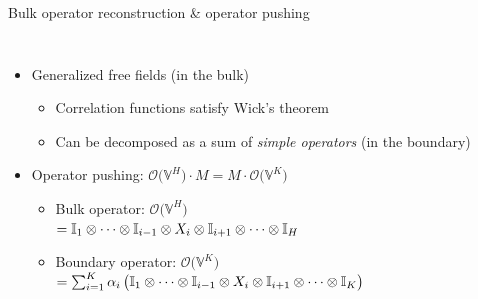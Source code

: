 \documentclass{fdubeamer}
\begin{document}
\begin{frame}{Bulk operator reconstruction \& operator pushing}

\begin{columns}[c]


    \begin{itemize}
      \item Generalized free fields (in the bulk)

        \begin{itemize}
          \item Correlation functions satisfy Wick's theorem
          \item Can be decomposed as a sum of \emph{simple operators} (in the boundary)
        \end{itemize}

      \item Operator pushing: $\mathcal{O} \bigl( \mathbb{V}^H \bigr) \cdot M = M \cdot \mathcal{O} \bigl( \mathbb{V}^K \bigr)$
        \begin{itemize}
          \item Bulk operator: $\mathcal{O} \bigl( \mathbb{V}^H \bigr)$ \\
            \mbox{\quad}
            $
              = \mathbb{I}_1 \otimes \cdots \otimes \mathbb{I}_{i-1} \otimes X_i \otimes \mathbb{I}_{i+1} \otimes \dots \otimes \mathbb{I}_{H}
            $
          \item Boundary operator: $\mathcal{O} \bigl( \mathbb{V}^K \bigr)$ \\
            \mbox{\quad}
            $
              = \sum_{i=1}^K \alpha_i \, \bigl(
                  \mathbb{I}_1 \otimes \cdots \otimes \mathbb{I}_{i-1} \otimes X_i \otimes \mathbb{I}_{i+1} \otimes \dots \otimes \mathbb{I}_{K}
                \bigr)
            $
        \end{itemize}
    \end{itemize}


    \begin{center}
      \scriptsize
      \tikzset{x=1em, y=1em, node font=\tiny}
    \end{center}

\end{columns}


\end{frame}
\end{document}
